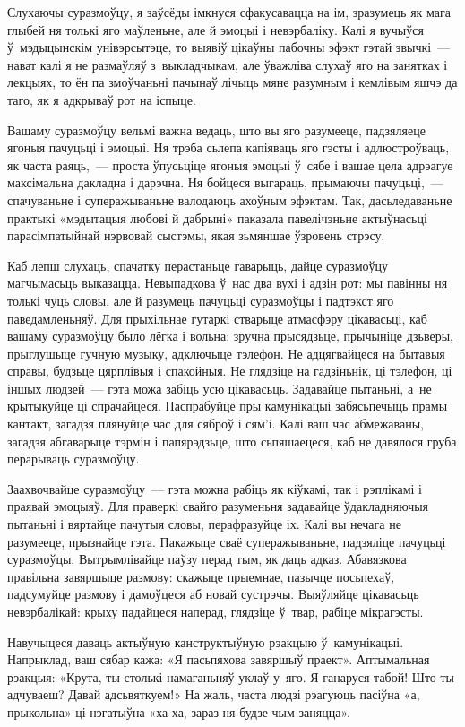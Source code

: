 Слухаючы суразмоўцу, я заўсёды імкнуся сфакусавацца на ім, зразумець як мага глыбей ня толькі яго маўленьне, але й эмоцыі і невэрбаліку. Калі я вучыўся ў~мэдыцынскім унівэрсытэце, то выявіў цікаўны пабочны эфэкт гэтай звычкі~--- нават калі я не размаўляў з~выкладчыкам, але ўважліва слухаў яго на занятках і лекцыях, то ён па змоўчаньні пачынаў лічыць мяне разумным і кемлівым яшчэ да таго, як я адкрываў рот на іспыце.

Вашаму суразмоўцу вельмі важна ведаць, што вы яго разумееце, падзяляеце ягоныя пачуцьці і эмоцыі. Ня трэба сьлепа капіяваць яго гэсты і адлюстроўваць, як часта раяць,~--- проста ўпусьціце ягоныя эмоцыі ў~сябе і вашае цела адрэагуе максімальна дакладна і дарэчна. Ня бойцеся выгараць, прымаючы пачуцьці,~--- спачуваньне і суперажываньне валодаюць ахоўным эфэктам. Так, дасьледаваньне практыкі «мэдытацыя любові й дабрыні» паказала павелічэньне актыўнасьці парасімпатыйнай нэрвовай сыстэмы, якая зьмяншае ўзровень стрэсу.

Каб лепш слухаць, спачатку перастаньце гаварыць, дайце суразмоўцу магчымасьць выказацца. Невыпадкова ў~нас два вухі і адзін рот: мы павінны ня толькі чуць словы, але й разумець пачуцьці суразмоўцы і падтэкст яго паведамленьняў. Для прыхільнае гутаркі стварыце атмасфэру цікавасьці, каб вашаму суразмоўцу было лёгка і вольна: зручна прысядзьце, прычыніце дзьверы, прыглушыце гучную музыку, адключыце тэлефон. Не адцягвайцеся на бытавыя справы, будзьце цярплівыя і спакойныя. Не глядзіце на гадзіньнік, ці тэлефон, ці іншых людзей~--- гэта можа забіць усю цікавасьць. Задавайце пытаньні, а~не крытыкуйце ці спрачайцеся. Паспрабуйце пры камунікацыі забясьпечыць прамы кантакт, загадзя плянуйце час для сяброў і сям'і. Калі ваш час абмежаваны, загадзя абгаварыце тэрмін і папярэдзьце, што сьпяшаецеся, каб не давялося груба перарываць суразмоўцу.

Заахвочвайце суразмоўцу~--- гэта можна рабіць як кіўкамі, так і рэплікамі і праявай эмоцыяў. Для праверкі свайго разуменьня задавайце ўдакладняючыя пытаньні і вяртайце пачутыя словы, перафразуйце іх. Калі вы нечага не разумееце, прызнайце гэта. Пакажыце сваё суперажываньне, падзяліце пачуцьці суразмоўцы. Вытрымлівайце паўзу перад тым, як даць адказ. Абавязкова правільна завяршыце размову: скажыце прыемнае, пазычце посьпехаў, падсумуйце размову і дамоўцеся аб новай сустрэчы. Выяўляйце цікавасьць невэрбалікай: крыху падайцеся наперад, глядзіце ў~твар, рабіце мікрагэсты.

Навучыцеся даваць актыўную канструктыўную рэакцыю ў~камунікацыі. Напрыклад, ваш сябар кажа: «Я пасьпяхова завяршыў праект». Аптымальная рэакцыя: «Крута, ты столькі намаганьняў уклаў у~яго. Я ганаруся табой! Што ты адчуваеш? Давай адсьвяткуем!» На жаль, часта людзі рэагуюць пасіўна «а, прыкольна» ці нэгатыўна «ха-ха, зараз ня будзе чым заняцца».

